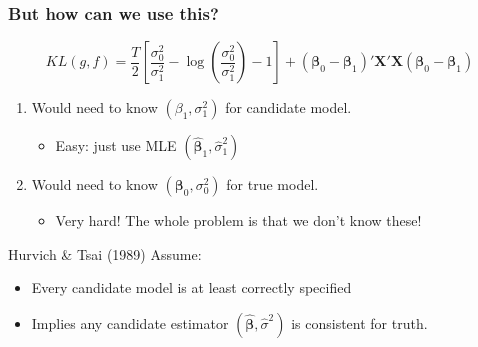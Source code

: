 \begin{frame}
  \frametitle{But how can we use this?}
  \vspace{-1em}
      \[
        KL(g,f) = \frac{T}{2}\left[ \frac{\sigma_0^2}{\sigma_1^2} - \log \left( \frac{\sigma_0^2}{\sigma_1^2} \right) - 1\right] + (\boldsymbol{\beta}_0 - \boldsymbol{\beta}_1)' \mathbf{X}'\mathbf{X} (\boldsymbol{\beta}_0 - \boldsymbol{\beta}_1)
      \]
      \vspace{-1em}
      \begin{enumerate}
        \item Would need to know $(\beta_1, \sigma_1^2)$ for \alert{candidate model}.
          \begin{itemize}
            \item Easy: just use MLE $(\widehat{\boldsymbol{\beta}}_1, \widehat{\sigma}_1^2)$
          \end{itemize}
        \item Would need to know $(\boldsymbol{\beta}_0, \sigma_0^2)$ for \alert{true model}.
          \begin{itemize}
            \item Very hard! The whole problem is that we don't know these!
          \end{itemize}
      \end{enumerate}

      \pause

      \begin{block}{Hurvich \& Tsai (1989) Assume:}
        \vspace{-0.5em}
        \begin{itemize}
          \item Every candidate model is \alert{at least correctly specified}
          \item Implies any candidate estimator $(\widehat{\boldsymbol{\beta}}, \widehat{\sigma}^2)$ is consistent for truth.
        \end{itemize}

      \end{block}
\end{frame}
